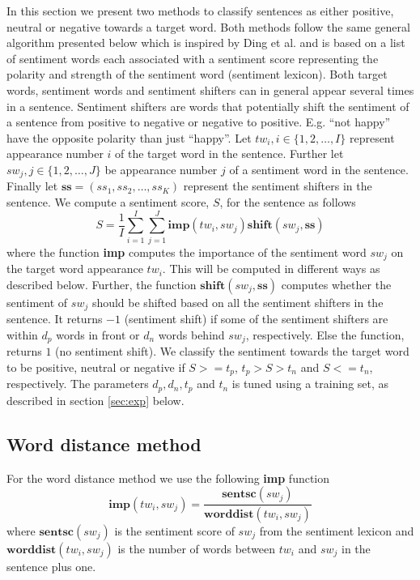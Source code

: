 \documentclass[11pt]{article}
\begin{document}
In this section we present two methods to classify sentences as either positive, neutral or negative towards a target word. Both methods follow the same general algorithm presented below which is inspired by Ding et al.  and is based on a list of sentiment words each associated with a sentiment score representing the polarity and strength of the sentiment word (sentiment lexicon). Both target words, sentiment words and sentiment shifters can in general appear several times in a sentence. Sentiment shifters are words that potentially shift the sentiment of a sentence from positive to negative or negative to positive. E.g. ``not happy'' have the opposite polarity than just ``happy''. Let $tw_i, i \in \{1,2,\ldots,I\}$ represent appearance number $i$ of the target word in the sentence. Further let $sw_{j}, j \in \{1,2,\ldots,J\}$ be appearance number $j$ of a sentiment word in the sentence. Finally let $\textbf{ss} = (ss_1, ss_2, \ldots, ss_K)$ represent the sentiment shifters in the sentence. We compute a sentiment score, $S$, for the sentence as follows
\begin{equation}
  \label{eq:1}
  S = \frac{1}{I}\sum_{i=1}^{I} \sum_{j=1}^{J} \mathbf{imp}(tw_i, sw_{j})\mathbf{shift}(sw_{j}, \mathbf{ss})    
\end{equation}
where the function \textbf{imp} computes the importance of the sentiment word $sw_{j}$ on the target word appearance $tw_i$. This will be computed in different ways as described below. Further, the function $\mathbf{shift}(sw_{j}, \mathbf{ss})$ computes whether the sentiment of $sw_{j}$ should be shifted based on all the sentiment shifters in the sentence. It returns $-1$ (sentiment shift) if some of the sentiment shifters are within $d_{p}$ words in front or $d_{n}$ words behind $sw_{j}$, respectively. Else the function, returns $1$ (no sentiment shift). We classify the sentiment towards the target word to be positive, neutral or negative if $S >= t_p$,  $t_p > S > t_n$ and  $S <= t_n$, respectively. The parameters $d_p, d_n, t_p$ and $t_n$ is tuned using a training set, as described in section \ref{sec:exp} below.

\subsection{Word distance method}
\label{sec:wd}

For the word distance method we use the following \textbf{imp} function
\begin{equation}
  \label{eq:2}
  \mathbf{imp}(tw_i, sw_{j}) = \frac{\mathbf{sentsc}(sw_{j})}{\mathbf{worddist}(tw_i, sw_{j})}
\end{equation}
where $\mathbf{sentsc}(sw_{j})$ is the sentiment score of $sw_{j}$ from the sentiment lexicon and $\mathbf{worddist}(tw_i, sw_{j})$ is the number of words between $tw_i$ and $sw_{j}$ in the sentence plus one.
\end{document}
